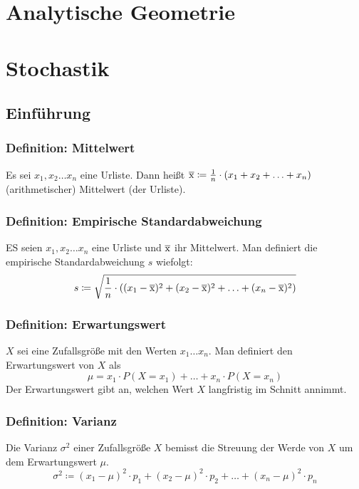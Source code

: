 \documentclass{article}
\begin{document}
  \section{Analytische Geometrie}
  
  \section{Stochastik}
  
  \subsection{Einführung}
  
  \subsubsection{Definition: Mittelwert}
  Es sei $x_1, x_2 \ldots x_n$ eine Urliste. Dann heißt $\overline{\rm x} \coloneqq \frac{1}{n} \cdot (x_1 + x_2 + \ldots + x_n)$ (arithmetischer) Mittelwert (der Urliste).
  
  \subsubsection{Definition: Empirische Standardabweichung}
  ES seien $x_1,x_2 \ldots x_n$ eine Urliste und $\overline{\rm x}$ ihr Mittelwert. Man definiert die empirische Standardabweichung $s$ wiefolgt: 
  \begin{equation*}
  	s \coloneqq \sqrt{\frac{1}{n} \cdot ((x_1 - \overline{\rm x})^2 + (x_2 - \overline{\rm x})^2 + \ldots + (x_n - \overline{\rm x})^2)}
  \end{equation*}
  
  \subsubsection{Definition: Erwartungswert}
  $X$ sei eine Zufallsgröße mit den Werten $x_1 \ldots x_n$. Man definiert den Erwartungswert von $X$ als
  \begin{equation*}
  	\mu = x_1 \cdot P(X = x_1) + \ldots + x_n \cdot P(X = x_n)
  \end{equation*}
  Der Erwartungswert gibt an, welchen Wert $X$ langfristig im Schnitt annimmt.
  
  \subsubsection{Definition: Varianz}
  Die Varianz $\sigma^2$ einer Zufallsgröße $X$ bemisst die Streuung der Werde von $X$ um dem Erwartungswert $\mu$. 
  \begin{equation*}
  	\sigma^2 \coloneqq (x_1 - \mu)^2 \cdot p_1 +  (x_2 - \mu)^2 \cdot p_2 + \ldots + (x_n - \mu)^2 \cdot p_n
  \end{equation*}
  
\end{document}
